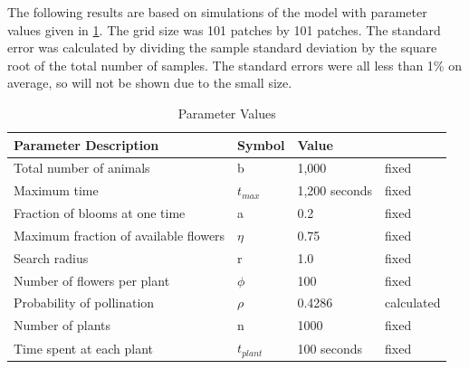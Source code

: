 The following results are based on simulations of the model with parameter
values given in \cref{tab:parameter}. %
The grid
size was 101 patches by 101 patches.  The standard error was calculated by
dividing the sample standard deviation by the square root of the total number of
samples. The standard errors were all less than 1\% on average, so will not be
shown due to the small size.

\begin{table}
  \centering
  \begin{tabular}{|l|l|l|l|}
    \hline
    Parameter Description & Symbol & Value &  \\ \hline  \label{parameter}
    Total number of animals & b & 1,000 & fixed  \\ \hline
    Maximum time & $t_{max}$ & 1,200 seconds & fixed \\ \hline
    Fraction of blooms at one time & a & 0.2 & fixed \\ \hline
    Maximum fraction of available flowers & $\eta$ & 0.75 & fixed \\ \hline
    Search radius & r & 1.0 & fixed \\ \hline
    Number of flowers per plant & $\phi$ & 100 & fixed \\ \hline
    Probability of pollination   & $\rho$ & 0.4286 & calculated \\ \hline
    Number of plants & n & 1000 & fixed \\ \hline
    Time spent at each plant & $t_{plant}$ & 100 seconds & fixed \\ \hline
  \end{tabular}
  \caption{Parameter Values}
  \label{tab:parameter}
\end{table}

